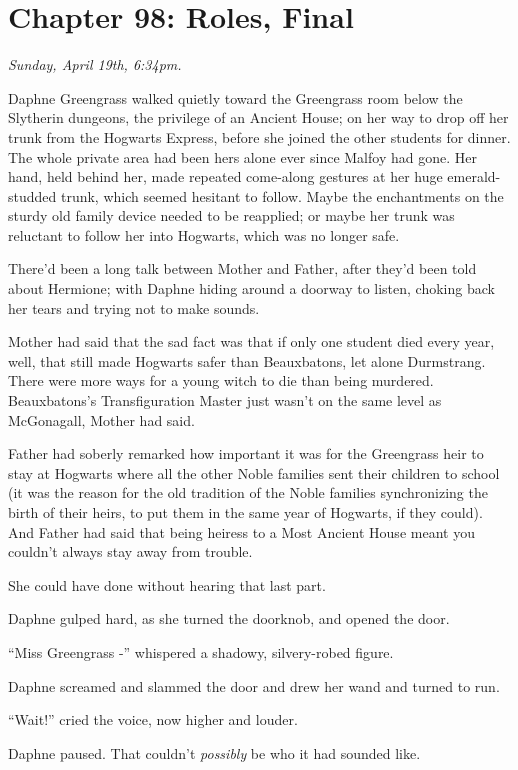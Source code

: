 \chapter{Chapter 98: Roles, Final}
\emph{Sunday, April 19th, 6:34pm.}

Daphne Greengrass walked quietly toward the Greengrass room below the
Slytherin dungeons, the privilege of an Ancient House; on her way to
drop off her trunk from the Hogwarts Express, before she joined the
other students for dinner. The whole private area had been hers alone
ever since Malfoy had gone. Her hand, held behind her, made repeated
come-along gestures at her huge emerald-studded trunk, which seemed
hesitant to follow. Maybe the enchantments on the sturdy old family
device needed to be reapplied; or maybe her trunk was reluctant to
follow her into Hogwarts, which was no longer safe.

There'd been a long talk between Mother and Father, after they'd been
told about Hermione; with Daphne hiding around a doorway to listen,
choking back her tears and trying not to make sounds.

Mother had said that the sad fact was that if only one student died
every year, well, that still made Hogwarts safer than Beauxbatons, let
alone Durmstrang. There were more ways for a young witch to die than
being murdered. Beauxbatons's Transfiguration Master just wasn't on the
same level as McGonagall, Mother had said.

Father had soberly remarked how important it was for the Greengrass heir
to stay at Hogwarts where all the other Noble families sent their
children to school (it was the reason for the old tradition of the Noble
families synchronizing the birth of their heirs, to put them in the same
year of Hogwarts, if they could). And Father had said that being heiress
to a Most Ancient House meant you couldn't always stay away from
trouble.

She could have done without hearing that last part.

Daphne gulped hard, as she turned the doorknob, and opened the door.

``Miss Greengrass -'' whispered a shadowy, silvery-robed figure.

Daphne screamed and slammed the door and drew her wand and turned to
run.

``Wait!'' cried the voice, now higher and louder.

Daphne paused. That couldn't \emph{possibly} be who it had sounded like.

